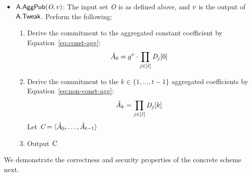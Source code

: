 \begin{itemize}
  \item[-] $\mathsf{A}.\mathsf{AggPub}(\textit{O}, v)$:
      The input set $\textit{O}$ is as defined above,
      and $v$ is the output of $\mathsf{A}.\mathsf{Tweak}$.
      Perform the following:
    \begin{enumerate}
      \item Derive the commitment to the aggregated constant coefficient by Equation~\ref{eq:const-agg}:
        \begin{equation} \label{eq:const-agg}
          \hat{A}_{0} = g^{v} \cdot \prod_{j \in [\mathsf{\ell}]} \textit{D}_j[0]
        \end{equation}
    \item Derive the commitment to the $k \in \{1, \ldots, t-1 \}$ aggregated coefficients by Equation~\ref{eq:non-const-agg}:
        \begin{equation} \label{eq:non-const-agg}
          \hat{A}_{k} = \prod_{j \in [\mathsf{\ell}]} \textit{D}_j[k]
        \end{equation}
        Let $\textit{C} = \langle\hat{A}_0, \ldots, \hat{A}_{t-1} \rangle$
      \item Output $\textit{C}$
    \end{enumerate}
\end{itemize}

We demonstrate the correctness and security properties of the concrete scheme next.



